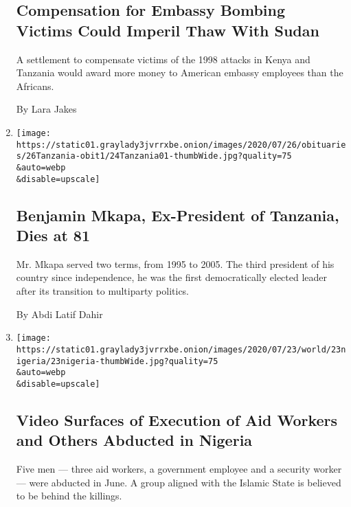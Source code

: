 \begin{enumerate}
{  \subsection{Compensation for Embassy Bombing Victims Could Imperil
  Thaw With
  Sudan}\label{compensation-for-embassy-bombing-victims-could-imperil-thaw-with-sudan}}

  A settlement to compensate victims of the 1998 attacks in Kenya and
  Tanzania would award more money to American embassy employees than the
  Africans.

  By Lara Jakes
\item
  \href{/2020/07/24/world/africa/benjamin-mkapa-dead.html}{}

  \texttt{[image: https://static01.graylady3jvrrxbe.onion/images/2020/07/26/obituaries/26Tanzania-obit1/24Tanzania01-thumbWide.jpg?quality=75\\\&auto=webp\\\&disable=upscale]}

  \hypertarget{benjamin-mkapa-ex-president-of-tanzania-dies-at-81}{%
  \subsection{Benjamin Mkapa, Ex-President of Tanzania, Dies at
  81}\label{benjamin-mkapa-ex-president-of-tanzania-dies-at-81}}

  Mr. Mkapa served two terms, from 1995 to 2005. The third president of
  his country since independence, he was the first democratically
  elected leader after its transition to multiparty politics.

  By Abdi Latif Dahir
\item
  \href{/2020/07/23/world/africa/aid-workers-executed-nigeria.html}{}

  \texttt{[image: https://static01.graylady3jvrrxbe.onion/images/2020/07/23/world/23nigeria/23nigeria-thumbWide.jpg?quality=75\\\&auto=webp\\\&disable=upscale]}

  \hypertarget{video-surfaces-of-execution-of-aid-workers-and-others-abducted-in-nigeria}{%
  \subsection{Video Surfaces of Execution of Aid Workers and Others
  Abducted in
  Nigeria}\label{video-surfaces-of-execution-of-aid-workers-and-others-abducted-in-nigeria}}

  Five men --- three aid workers, a government employee and a security
  worker --- were abducted in June. A group aligned with the Islamic
  State is believed to be behind the killings.


\end{enumerate}
